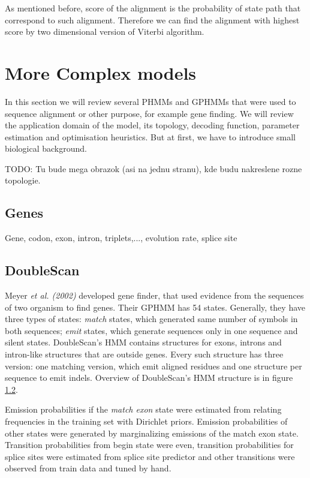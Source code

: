 As mentioned before, score of the alignment is the probability of state path
that correspond to such alignment. Therefore we can find the alignment with 
highest score by two dimensional version of Viterbi algorithm. 

\section{More Complex models}

In this section we will review several PHMMs and GPHMMs that were used to
sequence alignment or other purpose, for example gene finding. We will review
the application domain of the model, its topology, decoding function, parameter
estimation and optimisation heuristics. But at first, we have to introduce small
biological background.

TODO: Tu bude mega obrazok (asi na jednu stranu), kde budu nakreslene rozne
topologie.

\subsection{Genes}

Gene, codon, exon, intron, triplets,..., evolution rate, splice site

\subsection{DoubleScan}
Meyer {\it et al. (2002)} developed gene finder, that used evidence from the
sequences of two organism to find genes. Their GPHMM has 54 states. Generally,
they have three types of states: {\it match} states, which generated same number
of symbols in both sequences;   {\it emit} states, which generate sequences only
in one sequence and silent states. DoubleScan's HMM contains structures for
exons, introns and intron-like structures that are outside genes. Every such
structure has three version: one matching version, which emit aligned residues
and one structure per sequence to emit indels.  Overview of DoubleScan's HMM
structure is in figure \ref{}. 
\nocite{Meyer2002}

Emission probabilities if the {\it match exon} state were estimated from
relating frequencies in the training set with Dirichlet priors.
Emission probabilities of other states were generated  by marginalizing
emissions of the match exon state. Transition probabilities from begin state
were even, transition probabilities for splice sites were estimated from splice
site predictor and other transitions were observed from train data and tuned by
hand.


